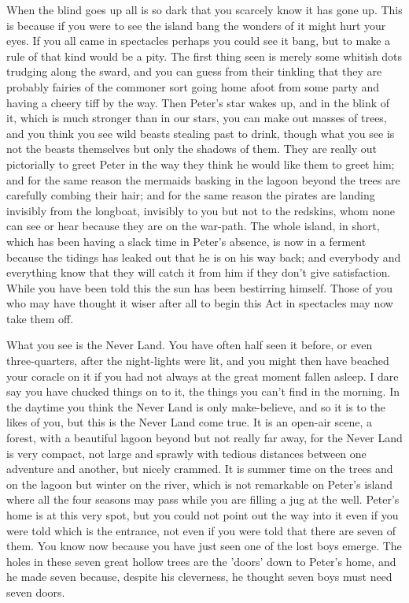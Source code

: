 

\begin{stagedir}

When the blind goes up all is so dark that you scarcely know it has gone up.
This is because if you were to see the island bang
the wonders of it might hurt your eyes.
If you all came in spectacles perhaps you could see it bang,
but to make a rule of that kind would be a pity.
The first thing seen is merely some whitish dots trudging along the sward,
and you can guess from their tinkling that they are probably fairies of the commoner sort
going home afoot from some party and having a cheery tiff by the way.
Then Peter's star wakes up,
and in the blink of it, which is much stronger than in our stars, you can make out masses of trees,
and you think you see wild beasts stealing past to drink,
though what you see is not the beasts themselves but only the shadows of them.
They are really out pictorially to greet Peter in the way they think he would like them to greet him;
and for the same reason the mermaids basking in the lagoon beyond the trees are carefully combing their hair;
and for the same reason the pirates are landing invisibly from the longboat,
invisibly to you but not to the redskins, whom none can see or hear because they are on the war-path.
The whole island, in short, which has been having a slack time in Peter's absence,
is now in a ferment because the tidings has leaked out that he is on his way back;
and everybody and everything know that they will catch it from him if they don't give satisfaction.
While you have been told this the sun
has been bestirring himself.
Those of you who may have thought it wiser after all to begin this Act in spectacles may now take them off.

What you see is the Never Land.
You have often half seen it before, or even three-quarters, after the night-lights were lit,
and you might then have beached your coracle on it if you had not always at the great moment fallen asleep.
I dare say you have chucked things on to it, the things you can't find in the morning.
In the daytime you think the Never Land is only make-believe, and so it is to the likes of you,
but this is the Never Land come true.
It is an open-air scene, a forest,
with a beautiful lagoon beyond but not really far away, for the Never Land is very compact,
not large and sprawly with tedious distances between one adventure and another, but nicely crammed.
It is summer time on the trees and on the lagoon but winter on the river,
which is not remarkable on Peter's island where all the four seasons may pass while you are filling a jug at the well.
Peter's home is at this very spot,
but you could not point out the way into it even if you were told which is the entrance,
not even if you were told that there are seven of them.
You know now because you have just seen one of the lost boys emerge.
The holes in these seven great hollow trees are the 'doors' down to Peter's home,
and he made seven because, despite his cleverness, he thought seven boys must need seven doors.


\end{stagedir}
